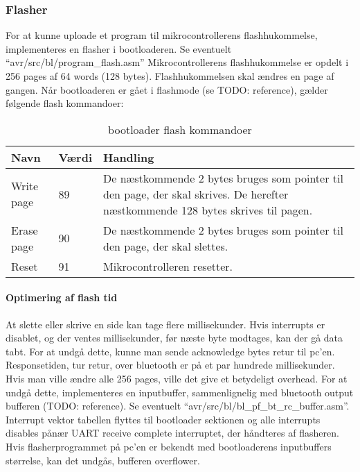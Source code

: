 \subsubsection{Flasher}
For at kunne uploade et program til mikrocontrollerens flashhukommelse, implementeres en flasher i bootloaderen.
Se eventuelt \mbox{``avr/src/bl/program\_flash.asm''}
Mikrocontrollerens flashhukommelse er opdelt i 256 pages af 64 words (128 bytes). Flashhukommelsen skal ændres en page af gangen.
Når bootloaderen er gået i flashmode (se TODO: reference), gælder følgende flash kommandoer:
\begin{table}[H]
	\caption{bootloader flash kommandoer}
	\label{tab:blflashcommands}
	\centering
	\begin{tabular}{|l|l|p{13cm}|}
		\hline
		\textbf{Navn} & \textbf{Værdi} & \textbf{Handling} \\
		\hline
		Write page & 89 & De næstkommende 2 bytes bruges som pointer til den page, der skal skrives. De herefter næstkommende 128 bytes skrives til pagen.\\
		\hline
		Erase page & 90 & De næstkommende 2 bytes bruges som pointer til den page, der skal slettes.\\
		\hline
		Reset & 91 & Mikrocontrolleren resetter.\\
		\hline
	\end{tabular}
\end{table}
\paragraph{Optimering af flash tid}
At slette eller skrive en side kan tage flere millisekunder. Hvis interrupts er disablet, og der ventes millisekunder, før næste byte modtages, kan der gå data tabt. For at undgå dette, kunne man sende acknowledge bytes retur til pc'en. Responsetiden, tur retur, over bluetooth er på et par hundrede millisekunder. Hvis man ville ændre alle 256 pages, ville det give et betydeligt overhead.
For at undgå dette, implementeres en inputbuffer, sammenlignelig med bluetooth output bufferen (TODO: reference). Se eventuelt \mbox{``avr/src/bl/bl\_pf\_bt\_rc\_buffer.asm''}. Interrupt vektor tabellen flyttes til bootloader sektionen og alle interrupts disables pånær UART receive complete interruptet, der håndteres af flasheren. Hvis flasherprogrammet på pc'en er bekendt med bootloaderens inputbuffers størrelse, kan det undgås, bufferen overflower.
